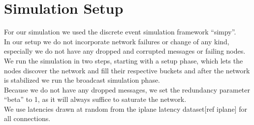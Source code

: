 \section{Simulation Setup}
For our simulation we used the discrete event simulation framework ``simpy''. \\
In our setup we do not incorporate network failures or change of any kind,
especially we do not have any dropped and corrupted messages or failing nodes. \\
We run the simulation in two steps, starting with a setup phase, which
lets the nodes discover the network and fill their respective buckets and
after the network is stabilized we run the broadcast simulation phase. \\
Because we do not have any dropped messages, we set the redundancy parameter ``beta''
to 1, as it will always suffice to saturate the network. \\
We use latencies drawn at random from the iplane latency dataset[ref iplane] for all connections.





